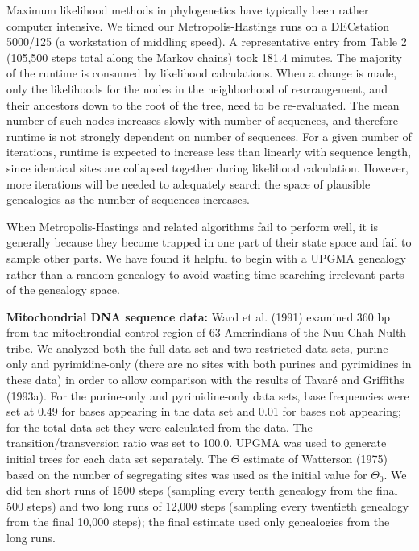 \documentclass[12pt]{article}
\begin{document}
Maximum likelihood methods in phylogenetics have typically been rather
computer intensive.
We timed our Metropolis-Hastings runs on a DECstation 5000/125 (a workstation of 
middling speed).  A representative entry from Table 2 (105,500 steps total along
the Markov chains) took 181.4 minutes. 
The majority of the runtime is consumed by likelihood calculations.
When a change is made, only the likelihoods for the nodes in the
neighborhood of rearrangement, and their ancestors down to the root of
the tree, need to be re-evaluated.  The mean number of such nodes
increases slowly with number of sequences, and therefore runtime is
not strongly dependent on number of sequences.
For a given number of iterations, runtime is expected to increase less than linearly with sequence
length, since identical sites are collapsed together during likelihood
calculation.  However, more iterations will be needed to adequately
search the space of plausible genealogies as the number of sequences
increases.

When Metropolis-Hastings and related algorithms fail to perform well, it
is generally because they become trapped in one part of their state
space and fail to sample other parts.  We have found it helpful to begin
with a UPGMA genealogy rather than a random genealogy to avoid wasting
time searching irrelevant parts of the genealogy space. 

{\bf Mitochondrial DNA sequence data:} 
{\sc Ward} et al. (1991) examined 360 bp from the
mitochrondial control region of 63 Amerindians of the Nuu-Chah-Nulth
tribe.  We analyzed both the full data set and two restricted data sets,
purine-only and pyrimidine-only (there are no sites with both purines
and pyrimidines in these data) in order to allow comparison with the
results of {\sc Tavar\'{e}} and {\sc Griffiths} (1993a). 
For the purine-only and pyrimidine-only data sets, base frequencies were
set at 0.49 for bases appearing in the data set and 0.01 for bases not
appearing; for the total data set they were calculated from the data.
The transition/transversion ratio was set to 100.0.   UPGMA was used to
generate initial trees for each data set separately.
The $\Theta$ estimate of {\sc Watterson} (1975) based on the 
number of segregating sites was used as the initial value for $\Theta_0$.
We did ten short runs of 1500 steps (sampling every tenth genealogy from the final
500 steps) and two long runs
of 12,000 steps (sampling every twentieth genealogy from the final
10,000 steps); the final estimate used only genealogies from the long runs.
\end{document}
